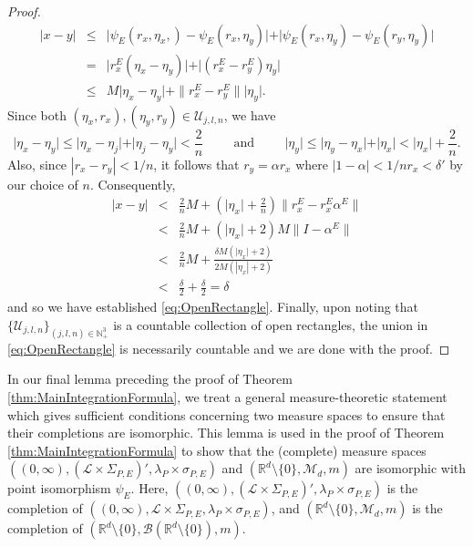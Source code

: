 \documentclass[11pt, letter]{book}
\begin{document}
\begin{proof}
\begin{eqnarray*}
| x - y | &\leq& \vert \psi_E(r_x,\eta_x,) - \psi_E(r_x,\eta_y) \vert 
    + \vert \psi_E(r_x,\eta_y) - \psi_E(r_y,\eta_y) \vert\\
    &=&  \vert r_x^E (\eta_x - \eta_y) \vert + \vert (r_x^E - r_y^E) \eta_y \vert\\
    &\leq& M\vert \eta_x - \eta_y \vert + \|{r_x^E - r_y^E}\|  \vert \eta_y \vert.
\end{eqnarray*}
Since both $(\eta_x,r_x),(\eta_y,r_y) \in \mathcal{U}_{j,l,n}$, we have
\begin{equation*}
    \vert \eta_x - \eta_y \vert \leq \vert \eta_x - \eta_j \vert + \vert \eta_j - \eta_y \vert < \frac{2}{n}
\hspace{1cm}\mbox{and}\hspace{1cm}
    \vert \eta_y \vert \leq \vert \eta_y - \eta_x \vert + \vert \eta_x \vert < \vert \eta_x \vert + \frac{2}{n}.
\end{equation*}
Also, since $|r_x-r_y|<1/n$, it follows that $r_y=\alpha r_x$ where $|1-\alpha|<1/nr_x < \delta'$ by our choice of $n$. Consequently,
\begin{eqnarray*}
    \vert x - y \vert 
    &< & \frac{2}{n} M+ \left( \vert \eta_x \vert + \frac{2}{n} \right) \|{r_x^E -  r_x^E \alpha^E}\|   \\ 
    &<& \frac{2}{n}M + \left( \vert \eta_x \vert + 2 \right)M\| I - \alpha^E\| \\
    &<&  \frac{2}{n}M +  \frac{\delta M \left( \vert \eta_x \vert + 2\right) }{2M (| \eta_x | + 2)}  \\
    &<& \frac{\delta}{2} + \frac{\delta}{2}=\delta 
\end{eqnarray*}
and so we have established \eqref{eq:OpenRectangle}. Finally, upon noting that $\{\mathcal{U}_{j,l,n}\}_{(j,l,n)\in\mathbb{N}_+^3}$ is a countable collection of open rectangles, the union in \eqref{eq:OpenRectangle} is necessarily countable and we are done with the proof.
\end{proof}

\noindent In our final lemma preceding the proof of Theorem \ref{thm:MainIntegrationFormula}, we treat a general measure-theoretic statement which gives sufficient conditions concerning two measure spaces to ensure that their completions are isomorphic. This lemma is used in the proof of Theorem \ref{thm:MainIntegrationFormula} to show that the (complete) measure spaces $((0,\infty),(\mathcal{L}\times \Sigma_{P,E})',\lambda_P\times \sigma_{P,E})$ and $(\mathbb{R}^d\setminus \{ 0\},\mathcal{M}_d,m)$ are isomorphic with point isomorphism $\psi_E$. Here, $((0,\infty),(\mathcal{L}\times \Sigma_{P,E})',\lambda_P\times \sigma_{P,E})$ is the completion of $((0,\infty),\mathcal{L}\times \Sigma_{P,E},\lambda_P\times \sigma_{P,E})$, and $(\mathbb{R}^d\setminus \{ 0\},\mathcal{M}_d,m)$ is the completion of $(\mathbb{R}^d\setminus \{ 0\},\mathcal{B}(\mathbb{R}^d\setminus\{ 0 \}),m)$. 
\end{document}
